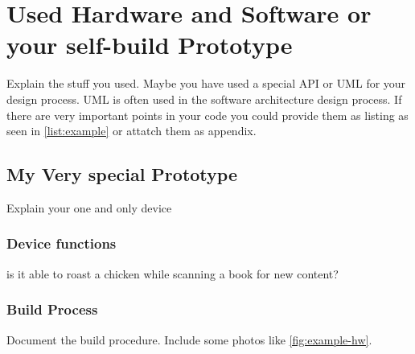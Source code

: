 
\chapter{Used Hardware and Software or your self-build Prototype}
\label{sec:hw}
Explain the stuff you used. Maybe you have used a special \ac{API} or \ac{UML} for your design process. \ac{UML} is often used in the software architecture design process. If there are very important points in your code you could provide them as listing as seen in \autoref{list:example} or attatch them as appendix.

\section{My Very special Prototype}
Explain your one and only device

\subsection{Device functions}
is it able to roast a chicken while scanning a book for new content?

\subsection{Build Process}
Document the build procedure. Include some photos like  \autoref{fig:example-hw}.

